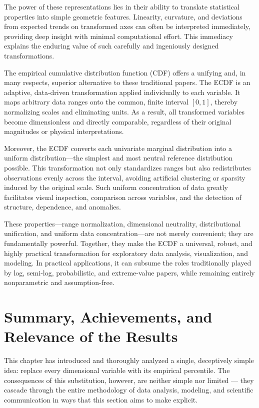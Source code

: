 The power of these representations lies in their ability to translate statistical properties into simple geometric features. Linearity, curvature, and deviations from expected trends on transformed axes can often be interpreted immediately, providing deep insight with minimal computational effort. This immediacy explains the enduring value of such carefully and ingeniously designed transformations.

The empirical cumulative distribution function (CDF) offers a unifying and, in many respects, superior alternative to these traditional papers. The ECDF is an adaptive, data-driven transformation applied individually to each variable. It maps arbitrary data ranges onto the common, finite interval
$[0,1]$, thereby normalizing scales and eliminating units. As a result, all transformed variables become dimensionless and directly comparable, regardless of their original magnitudes or physical interpretations.

Moreover, the ECDF converts each univariate marginal distribution into a uniform distribution—the simplest and most neutral reference distribution possible. This transformation not only standardizes ranges but also redistributes observations evenly across the interval, avoiding artificial clustering or sparsity induced by the original scale. Such uniform concentration of data greatly facilitates visual inspection, comparison across variables, and the detection of structure, dependence, and anomalies.

These properties—range normalization, dimensional neutrality, distributional unification, and uniform data concentration—are not merely convenient; they are fundamentally powerful. Together, they make the ECDF a universal, robust, and highly practical transformation for exploratory data analysis, visualization, and modeling. In practical applications, it can subsume the roles traditionally played by log, semi-log, probabilistic, and extreme-value papers, while remaining entirely nonparametric and assumption-free.


\section{Summary, Achievements, and Relevance of the Results}

This chapter has introduced and thoroughly analyzed a single, deceptively simple idea:
replace every dimensional variable with its empirical percentile. The consequences of
this substitution, however, are neither simple nor limited — they cascade through the
entire methodology of data analysis, modeling, and scientific communication in ways
that this section aims to make explicit.

